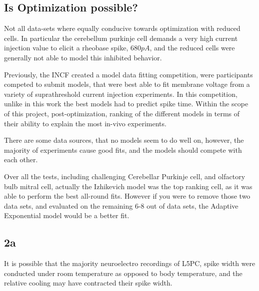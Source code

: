 \subsection{Is Optimization possible?}
Not all data-sets where equally conducive towards optimization with reduced cells. In particular the cerebellum purkinje cell demands a very high current injection value to elicit a rheobase spike, $680pA$, and the reduced cells were generally not able to model this inhibited behavior.

Previously, the INCF created a model data fitting competition, were participants competed to submit models, that were best able to fit membrane voltage from a variety of suprathreshold current injection experiments. In this competition, unlike in this work the best models had to predict spike time. Within the scope of this project, post-optimization, ranking of the different models in terms of their ability to explain the most in-vivo experiments. 

There are some data sources, that no models seem to do well on, however, the majority of experiments cause good fits, and the models should compete with each other.

Over all the tests, including challenging Cerebellar Purkinje cell, and olfactory bulb mitral cell, actually the Izhikevich model was the top ranking cell, as it was able to perform the best all-round fits. However if you were to remove those two data sets, and evaluated on the remaining 6-8 out of data sets, the Adaptive Exponential model would be a better fit.


%

\subsection{2a}


It is possible that the majority neuroelectro recordings of L5PC, spike width were conducted under room temperature as opposed to body temperature, and the relative cooling may have contracted their spike width.
\cite{goldin2017temperature}


